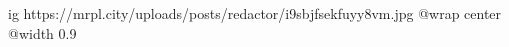  
 
 
 
 

\ifcmt
  ig https://mrpl.city/uploads/posts/redactor/i9sbjfsekfuyy8vm.jpg
  @wrap center
  @width 0.9
\fi
